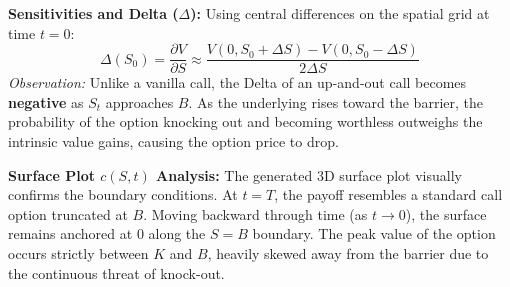 \textbf{Sensitivities and Delta ($\Delta$):}
Using central differences on the spatial grid at time $t=0$:
\begin{equation}
    \Delta(S_0) = \frac{\partial V}{\partial S} \approx \frac{V(0, S_0 + \Delta S) - V(0, S_0 - \Delta S)}{2 \Delta S}
\end{equation}
\textit{Observation:} Unlike a vanilla call, the Delta of an up-and-out call becomes \textbf{negative} as $S_t$ approaches $B$. As the underlying rises toward the barrier, the probability of the option knocking out and becoming worthless outweighs the intrinsic value gains, causing the option price to drop.

\textbf{Surface Plot $c(S, t)$ Analysis:}
The generated 3D surface plot visually confirms the boundary conditions. At $t=T$, the payoff resembles a standard call option truncated at $B$. Moving backward through time (as $t \to 0$), the surface remains anchored at $0$ along the $S=B$ boundary. The peak value of the option occurs strictly between $K$ and $B$, heavily skewed away from the barrier due to the continuous threat of knock-out.
